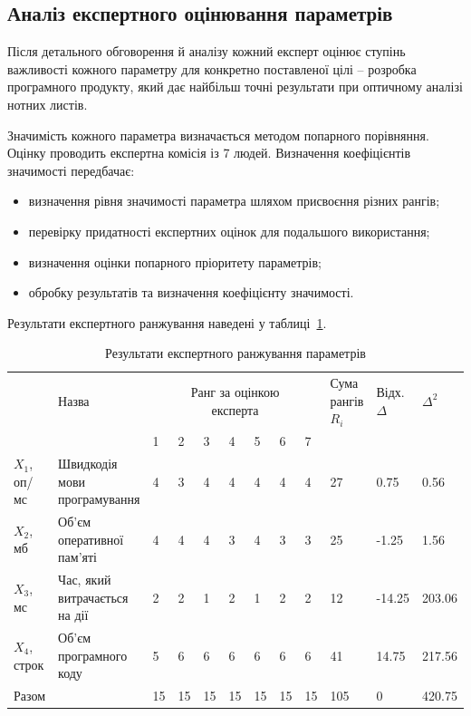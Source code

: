 \subsection{Аналіз експертного оцінювання параметрів}
Після детального обговорення й аналізу кожний експерт оцінює ступінь важливості кожного 
параметру для конкретно поставленої цілі – розробка програмного продукту, який дає найбільш 
точні результати при оптичному аналізі нотних листів.

Значимість кожного параметра визначається методом попарного порівняння. Оцінку проводить експертна комісія із 7 людей. Визначення коефіцієнтів значимості передбачає: 
\begin{itemize}
	\item визначення рівня значимості параметра шляхом присвоєння різних рангів; 
	\item перевірку придатності експертних оцінок для подальшого використання; 
	\item визначення оцінки попарного пріоритету параметрів; 
	\item обробку результатів та визначення коефіцієнту значимості. 
\end{itemize}

Результати експертного ранжування наведені у таблиці~\ref{tab:economics:parameter_range}.

\begin{table}
	\caption{Результати експертного ранжування параметрів}
	\centering
	\begin{tabular}{| m{} | p{} | m{} | m{} | m{} | m{} | m{} | m{} | m{} |	p{}|p{}|p{}|}
	\hline
	\multirow{2}{*}{\rotatebox{90}{Позначення  }} & Назва & \multicolumn{7}{c|}{\parbox[c]{0.3\textwidth}{Ранг за оцінкою\\експерта}} 	& Сума рангів $R_i$ & Відх. $\Delta$ &$\Delta^2 $ \\
	\cline{3-9}
			   & 	   & 1& 2& 3& 4& 5& 6& 7							&					&					&\\ 
	\hline
	$X_1$, оп/мс & Швидкодія мови програмування 	& 4& 3& 4& 4& 4& 4& 4& 27& 0.75 	& 0.56 \\
	\hline
	$X_2$, мб	& Об'єм оперативної пам'яті 	& 4& 4& 4& 3& 4& 3& 3& 25&-1.25	& 1.56 \\ 
	\hline
	$X_3$, мс	& Час, який витрачається на дії		& 2& 2& 1& 2& 1& 2& 2& 12&-14.25& 203.06\\
	\hline
	$X_4$, строк & Об'єм програмного коду		& 5& 6& 6& 6& 6& 6& 6& 41& 14.75& 217.56\\
	\hline
	Разом		& 								&15&15&15&15&15&15&15& 105 & 0 & 420.75\\
	\hline
	\end{tabular}
	\label{tab:economics:parameter_range}
\end{table}

